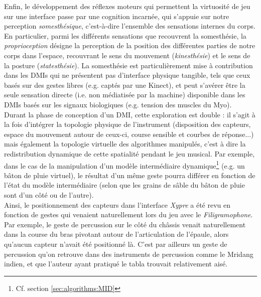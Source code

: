 \noindent Enfin, le développement des réflexes moteurs qui permettent la virtuosité de jeu sur une interface passe par une cognition incarnée, qui s'appuie sur notre perception \textit{somesthésique}, c'est-à-dire l'ensemble des sensations internes du corps. En particulier, parmi les différents sensations que recouvrent la somesthésie, la \textit{proprioception} désigne la perception de la position des différentes parties de notre corps dans l'espace, recouvrant le sens du mouvement (\textit{kinesthésie}) et le sens de la posture (\textit{statesthésie}). La somesthésie est particulièrement mise à contribution dans les \glspl{DMI} qui ne présentent pas d'interface physique tangible, tels que ceux basés sur des gestes libres (e.g. captés par une Kinect), et peut s'avérer être la seule sensation directe (i.e. non médiatisée par la machine) disponible dans les \glspl{DMI} basés sur les signaux biologiques (e.g. tension des muscles du Myo).\\
\indent Durant la phase de conception d'un \gls{DMI}, cette exploration est double : il s'agit à la fois d'intégrer la topologie physique de l'instrument (disposition des capteurs, espace du mouvement autour de ceux-ci, course sensible et courbes de réponse...) mais également la topologie virtuelle des algorithmes manipulés, c'est à dire la redistribution dynamique de cette spatialité pendant le jeu musical. Par exemple, dans le cas de la manipulation d'un modèle intermédiaire dynamique\footnote{Cf. section \ref{sec:algorithms:MID}} (e.g. un bâton de pluie virtuel), le résultat d'un même geste pourra différer en fonction de l'état du modèle intermédiaire (selon que les grains de sâble du bâton de pluie sont d'un côté ou de l'autre).\\
\indent Ainsi, le positionnement des capteurs dans l'interface \textit{Xypre} a été revu en fonction de gestes qui venaient naturellement lors du jeu avec le \textit{Filigramophone}. Par exemple, le geste de percussion sur le côté du châssis venait naturellement dans la course du bras pivotant autour de l'articulation de l'épaule, alors qu'aucun capteur n'avait été positionné là. C'est par ailleurs un geste de percussion qu'on retrouve dans des instruments de percussion comme le Mridang indien, et que l'auteur ayant pratiqué le tabla trouvait relativement aisé.



